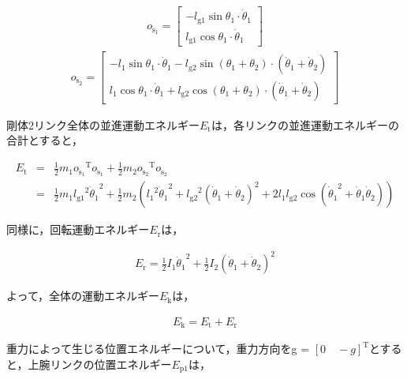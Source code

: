 \begin{eqnarray}
  o_{\mathrm{\dot{s}_{1}}} = 
              \begin{bmatrix}
              -l_{\mathrm{g1}}\sin\theta_{1} \cdot \dot{\theta}_{1}\\
              l_{\mathrm{g1}}\cos\theta_{1} \cdot \dot{\theta}_{1}
              \end{bmatrix}
\end{eqnarray}
\begin{eqnarray}
  o_{\mathrm{\dot{s}_{2}}} = 
              \begin{bmatrix}
                -l_{1}\sin\theta_{1} \cdot \dot{\theta}_{1} - l_{\mathrm{g2}}\sin(\theta_{1} + \theta_{2}) \cdot (\dot{\theta}_{1} + \dot{\theta}_{2})\\
                l_{1}\cos\theta_{1} \cdot \dot{\theta}_{1} + l_{\mathrm{g2}}\cos(\theta_{1} + \theta_{2}) \cdot (\dot{\theta}_{1} + \dot{\theta}_{2})
              \end{bmatrix}
\end{eqnarray}

剛体2リンク全体の並進運動エネルギー$E_{\mathrm{t}}$は，各リンクの並進運動エネルギーの合計とすると，

\begin{eqnarray}
  E_{\mathrm{t}}
  &=&\frac{1}{2}m_{1}o_{\mathrm{\dot{s}_{1}}}{}^\mathrm{T}\!o_{\mathrm{\dot{s}_{1}}} + \frac{1}{2}m_{2}o_{\mathrm{\dot{s}_{2}}}{}^\mathrm{T}\!o_{\mathrm{\dot{s}_{2}}} \nonumber \\
  &=&\frac{1}{2}m_{1}{l_{\mathrm{g1}}}^2{\dot{\theta}_{1}}^2 + \frac{1}{2}m_{2}({{l_{1}}^2}{\dot{\theta}_{1}}^2 + {l_{\mathrm{g2}}}^2(\dot{\theta}_{1} + \dot{\theta}_{2})^2 + 2{l_{1}}{l_{\mathrm{g2}}}\cos({\dot{\theta}_{1}}^2 + \dot{\theta}_{1}\dot{\theta}_{2}))
\end{eqnarray}

同様に，回転運動エネルギー$E_{\mathrm{r}}$は，

\begin{eqnarray}
  E_{\mathrm{r}}
  =\frac{1}{2}I_{1}{\dot{\theta}_{1}}^2 + \frac{1}{2}I_{2}(\dot{\theta}_{1} + \dot{\theta}_{2})^2
\end{eqnarray}

よって，全体の運動エネルギー$E_{\mathrm{k}}$は，

\begin{eqnarray}
  E_{\mathrm{k}}
  =E_{\mathrm{t}} + E_{\mathrm{r}}
\end{eqnarray}

重力によって生じる位置エネルギーについて，重力方向をg = ${[0 \quad -g]}^\mathrm{T}$とすると，上腕リンクの位置エネルギー$E_{\mathrm{p1}}$は，

